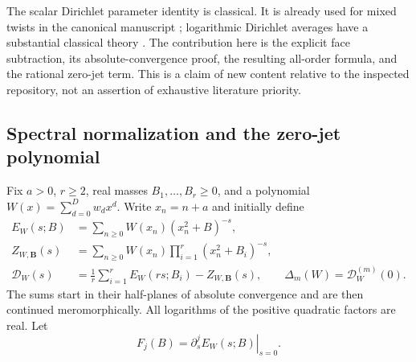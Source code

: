 \documentclass[11pt,a4paper]{article}
\numberwithin{equation}{section}
\theoremstyle{definition}
\theoremstyle{remark}
\begin{document}
The scalar Dirichlet parameter identity is classical.  It is already
used for mixed twists in the canonical manuscript
\cite[\texttt{07-mixed-twist-identities.tex}]{RepoMain}; logarithmic
Dirichlet averages have a substantial classical theory
\cite{sd:Carlson1987,sd:Carlson1991}.  The contribution here is the explicit
face subtraction, its absolute-convergence proof, the resulting
all-order formula, and the rational zero-jet term.  This is a claim of
new content relative to the inspected repository, not an assertion of
exhaustive literature priority.

\subsection{Spectral normalization and the zero-jet polynomial}
\label{sd:subsec:setup}

Fix $a>0$, $r\ge2$, real masses $B_1,\ldots,B_r\ge0$, and a polynomial
$W(x)=\sum_{d=0}^{D}w_dx^d$.  Write $x_n=n+a$ and initially define
\begin{align}
 E_W(s;B)&=\sum_{n\ge0}W(x_n)(x_n^2+B)^{-s},
       \label{sd:eq:one}\\
 Z_{W,\boldsymbol B}(s)&=\sum_{n\ge0}W(x_n)
                    \prod_{i=1}^r(x_n^2+B_i)^{-s},\label{sd:eq:many}\\
 \mathcal D_W(s)&=\frac1r\sum_{i=1}^rE_W(rs;B_i)
                          -Z_{W,\boldsymbol B}(s),\qquad
 \Delta_m(W)=\mathcal D_W^{(m)}(0).
       \label{sd:eq:defect}
\end{align}
The sums start in their half-planes of absolute convergence and are then
continued meromorphically.  All logarithms of the positive quadratic
factors are real.  Let
\begin{equation}\label{sd:eq:jets}
 F_j(B)=\left.\partial_s^j E_W(s;B)\right|_{s=0}.
\end{equation}
\end{document}

